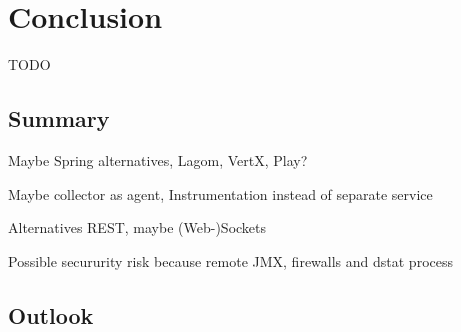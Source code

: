 \chapter{Conclusion}
TODO

\section{Summary}

Maybe Spring alternatives, Lagom, VertX, Play?

Maybe collector as agent, Instrumentation instead of separate service

Alternatives REST, maybe (Web-)Sockets

Possible secururity risk because remote JMX, firewalls and dstat process
\section{Outlook}

